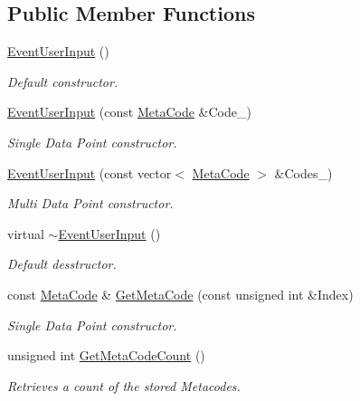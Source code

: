 \subsection*{Public Member Functions}
\begin{DoxyCompactItemize}
\item 
\hyperlink{classphys_1_1EventUserInput_ae7358d184021306da8979000c225845e}{EventUserInput} ()
\begin{DoxyCompactList}\small\item\em Default constructor. \item\end{DoxyCompactList}\item 
\hyperlink{classphys_1_1EventUserInput_af54d4604d18b25a2dc99a4a3090b9f1d}{EventUserInput} (const \hyperlink{classphys_1_1MetaCode}{MetaCode} \&Code\_\-)
\begin{DoxyCompactList}\small\item\em Single Data Point constructor. \item\end{DoxyCompactList}\item 
\hyperlink{classphys_1_1EventUserInput_a56ca671dd5d28396cab0d7036e08a1f1}{EventUserInput} (const vector$<$ \hyperlink{classphys_1_1MetaCode}{MetaCode} $>$ \&Codes\_\-)
\begin{DoxyCompactList}\small\item\em Multi Data Point constructor. \item\end{DoxyCompactList}\item 
virtual \hyperlink{classphys_1_1EventUserInput_a5c4bb6a5016dad4cb32f51cc1d88eac3}{$\sim$EventUserInput} ()
\begin{DoxyCompactList}\small\item\em Default desstructor. \item\end{DoxyCompactList}\item 
const \hyperlink{classphys_1_1MetaCode}{MetaCode} \& \hyperlink{classphys_1_1EventUserInput_a5f67c5ad4aa4edcce629955fd7d869ac}{GetMetaCode} (const unsigned int \&Index)
\begin{DoxyCompactList}\small\item\em Single Data Point constructor. \item\end{DoxyCompactList}\item 
unsigned int \hyperlink{classphys_1_1EventUserInput_a17aa65dcf0ef8689affa50232eec4ccb}{GetMetaCodeCount} ()
\begin{DoxyCompactList}\small\item\em Retrieves a count of the stored Metacodes. \item\end{DoxyCompactList}\item 

\end{DoxyCompactItemize}
